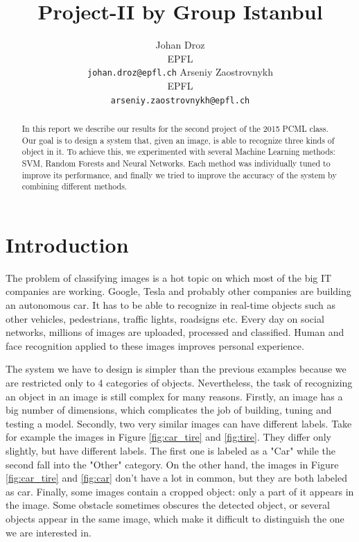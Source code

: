 \documentclass{article} %
\title{Project-II by Group Istanbul}
\author{
Johan Droz\\
EPFL \\
\texttt{johan.droz@epfl.ch} \And
Arseniy Zaostrovnykh\\
EPFL \\
\texttt{arseniy.zaostrovnykh@epfl.ch}
}
\begin{document}
\maketitle

\begin{abstract}
In this report we describe our results for the second project of the 2015 PCML class.
Our goal is to design a system that, given an image, is able to recognize three kinds of object in it.
To achieve this, we experimented with several Machine Learning methods: SVM, Random Forests and Neural Networks. Each method was individually tuned to improve its performance, and finally we tried to improve the accuracy of the system by combining different methods.

\end{abstract}

\section{Introduction}

The problem of classifying images is a hot topic on which most of the big IT companies are working.
Google\cite{GoogleCar}, Tesla\cite{TeslaAutopilot} and probably other companies are building an autonomous car. It has to be able to recognize in real-time objects such as other vehicles, pedestrians, traffic lights, roadsigns etc.
Every day on social networks, millions of images are uploaded, processed and classified\cite{facebook}. Human and face recognition applied to these images improves personal experience. 

The system we have to design is simpler than the previous examples because we are restricted only to 4 categories of objects. Nevertheless, the task of recognizing an object in an image is still complex for many reasons.
Firstly, an image has a big number of dimensions, which complicates the job of building, tuning and testing a model.
Secondly, two very similar images can have different labels.
Take for example the images in Figure \ref{fig:car_tire} and \ref{fig:tire}. They differ only slightly, but have different labels. The first one is labeled as a "Car" while the second fall into the "Other" category. On the other hand, the images in Figure \ref{fig:car_tire} and \ref{fig:car} don't have a lot in common, but they are both labeled as car.
Finally, some images contain a cropped object: only a part of it appears in the image. Some obstacle sometimes obscures the detected object, or several objects appear in the same image, which make it difficult to distinguish the one we are interested in.
\end{document}
